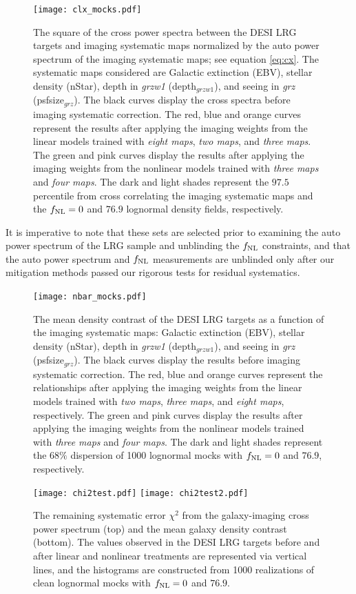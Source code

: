 \begin{figure}
\centering
\texttt{[image: clx\_mocks.pdf]}
\caption{The square of the cross power spectra between the DESI LRG targets and imaging systematic maps normalized by the auto power spectrum of the imaging systematic maps; see equation \ref{eq:cx}. The systematic maps considered are Galactic extinction (EBV), stellar density (nStar), depth in \textit{grzw1} (depth$_{grzw1}$), and seeing in \textit{grz} (psfsize$_{grz}$). The black curves display the cross spectra before imaging systematic correction. The red, blue and orange curves represent the results after applying the imaging weights from the linear models trained with \textit{eight maps}, \textit{two maps}, and \textit{three maps}. The green and pink curves display the results after applying the imaging weights from the nonlinear models trained with \textit{three maps} and \textit{four maps}. The dark and light shades represent the $97.5$ percentile from cross correlating the imaging systematic maps and the $f_{\rm NL}=0$ and $76.9$ lognormal density fields, respectively.}\label{fig:clxmock}
\end{figure}

It is imperative to note that these sets are selected prior to examining the auto power spectrum of the LRG sample and unblinding the $f_{\rm NL}$ constraints, and that the auto power spectrum and $f_{\rm NL}$ measurements are unblinded only after our mitigation methods passed our rigorous tests for residual systematics. 

\begin{figure}
\centering
\texttt{[image: nbar\_mocks.pdf]}
\caption{The mean density contrast of the DESI LRG targets as a function of the imaging systematic maps: Galactic extinction (EBV), stellar density (nStar), depth in \textit{grzw1} (depth$_{grzw1}$), and seeing in \textit{grz} (psfsize$_{grz}$). The black curves display the results before imaging systematic correction. The red, blue and orange curves represent the relationships after applying the imaging weights from the linear models trained with \textit{two maps}, \textit{three maps}, and \textit{eight maps}, respectively. The green and pink curves display the results after applying the imaging weights from the nonlinear models trained with \textit{three maps} and \textit{four maps}. The dark and light shades represent the $68\%$ dispersion of 1000 lognormal mocks with $f_{\rm NL}=0$ and $76.9$, respectively.}\label{fig:nbarmock}
\end{figure}


\begin{figure}
\raggedright
\texttt{[image: chi2test.pdf]}
\texttt{[image: chi2test2.pdf]}
\caption{The remaining systematic error $\chi^{2}$ from the galaxy-imaging cross power spectrum (top) and the mean galaxy density contrast (bottom). The values observed in the DESI LRG targets before and after linear and nonlinear treatments are represented via vertical lines, and the histograms are constructed from 1000 realizations of clean lognormal mocks with $f_{\rm NL}=0$ and $76.9$.}\label{fig:chi2test}
\end{figure}


